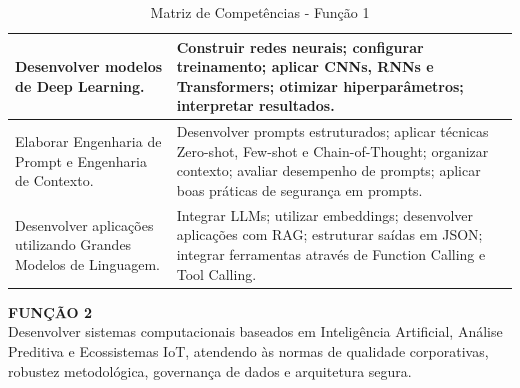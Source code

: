 \begin{table}[htb]
\begin{tabular}{|p{6cm}|p{10cm}|}
\hline
Desenvolver modelos de Deep Learning. & Construir redes neurais; configurar treinamento; aplicar CNNs, RNNs e Transformers; otimizar hiperparâmetros; interpretar resultados. \\
\hline
Elaborar Engenharia de Prompt e Engenharia de Contexto. & Desenvolver prompts estruturados; aplicar técnicas Zero-shot, Few-shot e Chain-of-Thought; organizar contexto; avaliar desempenho de prompts; aplicar boas práticas de segurança em prompts. \\
\hline
Desenvolver aplicações utilizando Grandes Modelos de Linguagem. & Integrar LLMs; utilizar embeddings; desenvolver aplicações com RAG; estruturar saídas em JSON; integrar ferramentas através de Function Calling e Tool Calling. \\
\hline
\end{tabular}
\caption{Matriz de Competências - Função 1}
\label{tab:matriz_funcao1}
\end{table}

\vspace{1cm}

\newpage

\textbf{FUNÇÃO 2} \\
Desenvolver sistemas computacionais baseados em Inteligência Artificial, Análise Preditiva e Ecossistemas IoT, atendendo às normas de qualidade corporativas, robustez metodológica, governança de dados e arquitetura segura.


